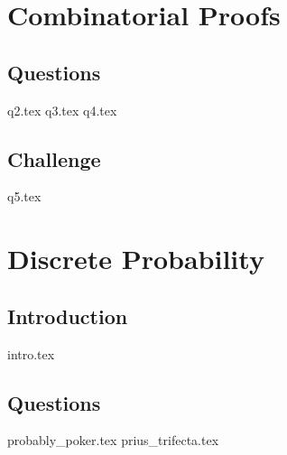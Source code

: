 \documentclass{exam}
\begin{document}
\newpage

\section{Combinatorial Proofs}
\subsection{Questions}
\begin{questions}
{q2.tex}
{q3.tex}
{q4.tex}
\end{questions}
\subsection{Challenge}
\begin{questions}
{q5.tex}
\end{questions}

\newpage 

\section{Discrete Probability}
\subsection{Introduction}
{intro.tex}
\subsection{Questions}
\begin{questions}
{probably_poker.tex}
{prius_trifecta.tex}
\end{questions}

\newpage

\end{document}
